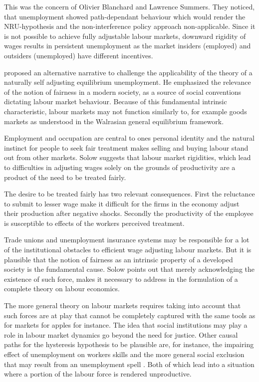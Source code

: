 \documentclass[12pt,a4paper,english]{article}
\begin{document}
This was the concern of Olivier Blanchard and Lawrence Summers. They noticed, that unemployment showed path-dependant behaviour which would render the NRU-hypothesis and the non-interference policy approach non-applicable. Since it is not possible to achieve fully adjustable labour markets, downward rigidity of wages results in persistent unemployment as the market insiders (employed) and outsiders (unemployed) have different incentives. \citep{blanchard1986,blanchard1987} 

\cite{solow1990} proposed an alternative narrative to challenge the applicability of the theory of a naturally self adjusting equilibrium unemployment. He emphasized the relevance of the notion of fairness in a modern society, as a source of social conventions dictating labour market behaviour. Because of this fundamental intrinsic characteristic, labour markets may not function similarly to, for example goods markets as understood in the Walrasian general equilibrium framework. 

Employment and occupation are central to ones personal identity and the natural instinct for people to seek fair treatment makes selling and buying labour stand out from other markets. Solow suggests that labour market rigidities, which lead to difficulties in adjusting wages solely on the grounds of productivity are a product of the need to be treated fairly.

The desire to be treated fairly has two relevant consequences. First the reluctance to submit to lesser wage make it difficult for the firms in the economy adjust their production after negative shocks. Secondly the productivity of the employee is susceptible to effects of the workers perceived treatment. \citep{adams1962}

Trade unions and unemployment insurance systems may be responsible for a lot of the institutional obstacles to efficient wage adjusting labour markets. But it is plausible that the notion of fairness as an intrinsic property of a developed society is the fundamental cause. Solow \citeyearpar{solow1990} points out that merely acknowledging the existence of such force, makes it  necessary to address in the formulation of a complete theory on labour economics.

The more general theory on labour markets requires taking into account that such forces are at play that cannot be completely captured with the same tools as for markets for apples for instance. The idea that social institutions may play a role in labour market dynamics go beyond the need for justice. Other causal paths for the hysteresis hypothesis to be plausible are, for instance, the impairing effect of unemployment on workers skills \citep{pissarides1992} and the more general social exclusion that may result from an unemployment spell \citep{kieselbach2003}. Both of which lead into a situation where a portion of the labour force is rendered unproductive.
\end{document}
